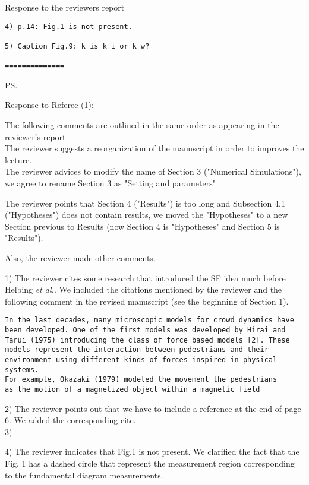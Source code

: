 \documentclass[a4paper,12pt]{letter}
\begin{document}
\begin{letter}{Response to the reviewers report}
\begin{verbatim}
4) p.14: Fig.1 is not present.

5) Caption Fig.9: k is k_i or k_w?

==============
\end{verbatim}


\ps{Response to Referee (1): 

The following comments are outlined in the same order as appearing in the
reviewer’s report. \\

The reviewer suggests a reorganization of the manuscript in order to improves 
the lecture. \\ 

The reviewer advices to modify the name of Section 3 ("Numerical Simulations"), we agree to rename 
Section 3 as "Setting and parameters"

The reviewer points that Section 4 ("Results") is too long and Subsection 4.1 ("Hypotheses")
does not contain results, we moved the "Hypotheses" to a new Section previous to Results 
(now Section 4 is "Hypotheses" and Section 5 is "Results"). 

Also, the reviewer made other comments.

1) The reviewer cites some research that introduced the SF idea much before 
Helbing \textit{et al.}. We included the citations mentioned by the reviewer 
and the following comment in the revised manuscript (see the beginning of Section 1). 

\begin{verbatim}
In the last decades, many microscopic models for crowd dynamics have
been developed. One of the first models was developed by Hirai and 
Tarui (1975) introducing the class of force based models [2]. These
models represent the interaction between pedestrians and their 
environment using different kinds of forces inspired in physical systems.
For example, Okazaki (1979) modeled the movement the pedestrians 
as the motion of a magnetized object within a magnetic field
\end{verbatim}

2) The reviewer points out that we have to include a reference at the end of 
page 6. We added the corresponding cite. \\

3) ---

4) The reviewer indicates that Fig.1 is not present. We clarified the fact that the Fig. 1 has a 
dashed circle that represent the measurement region corresponding to the fundamental diagram measurements. 

}
\end{letter}
\end{document}
